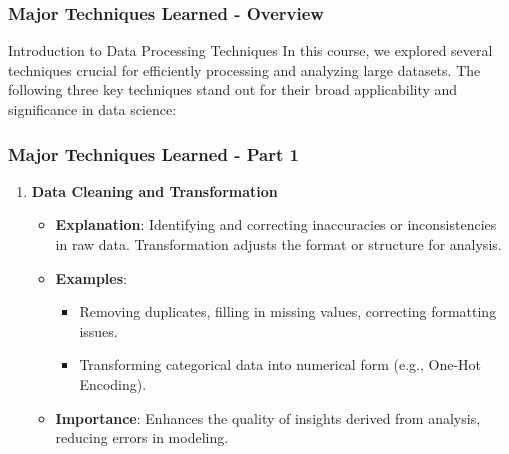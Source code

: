 \documentclass[aspectratio=169]{beamer}
\begin{document}
\begin{frame}[fragile]
    \frametitle{Major Techniques Learned - Overview}
    \begin{block}{Introduction to Data Processing Techniques}
        In this course, we explored several techniques crucial for efficiently processing and analyzing large datasets. The following three key techniques stand out for their broad applicability and significance in data science:
    \end{block}
\end{frame}

\begin{frame}[fragile]
    \frametitle{Major Techniques Learned - Part 1}
    \begin{enumerate}
        \item \textbf{Data Cleaning and Transformation}
        \begin{itemize}
            \item \textbf{Explanation}: Identifying and correcting inaccuracies or inconsistencies in raw data. Transformation adjusts the format or structure for analysis.
            \item \textbf{Examples}:
                \begin{itemize}
                    \item Removing duplicates, filling in missing values, correcting formatting issues.
                    \item Transforming categorical data into numerical form (e.g., One-Hot Encoding).
                \end{itemize}
            \item \textbf{Importance}: Enhances the quality of insights derived from analysis, reducing errors in modeling.
        \end{itemize}
    \end{enumerate}
\end{frame}
\end{document}
